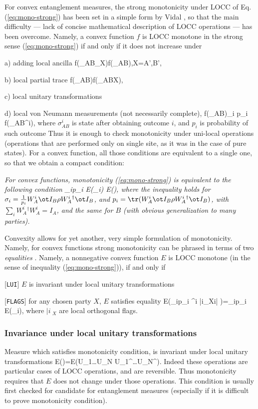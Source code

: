 \documentclass[rmp,12pt,preprint]{revtex4-2}
\begin{document}
For convex entanglement measures, the strong monotonicity under LOCC
of Eq. (\ref{eq:mono-strong}) has been set in a simple form by Vidal
\cite{Vidal-mon2000}, so that the main difficulty --- lack of concise
mathematical description of LOCC operations --- has been overcome.
Namely, a convex function $f$ is LOCC monotone in the strong sense
(\ref{eq:mono-strong}) if and only if it does not increase under
\bei
\item[a)] adding local ancilla
\be
f(\rho_{AB}\ot \sigma_X)\leq f(\rho_{AB}),\quad X=A',B',
\ee
\item[b)] local partial trace
\be
f(\rho_{AB})\leq f(\rho_{ABX}),
\ee
\item[c)] local unitary transformations
\item[d)] local von Neumann measurements (not necessarily complete),
\be
f(\rho_{AB})\geq \sum_i p_i f(\sigma_{AB}^i),
\ee
where $\sigma_{AB}^i$ is state after obtaining outcome $i$,
and $p_i$ is probability of such outcome
\eei
Thus it is enough to check monotonicity under uni-local operations
(operations that are performed only on  single  site, as it was in the case of pure states).
For a convex function, all those conditions are equivalent
to a single one, so that we obtain a compact condition:

{\it For convex functions, monotonicity
(\ref{eq:mono-strong}) is equivalent to the following condition \be
\sum_ip_i E(\sigma_i) \leq E(\rho), \label{eq:mono-unilocal} \ee
where the inequality holds for $\sigma_i=\frac{1}{p_i}W_A^i \ot I_B
\rho W_A^i{}^\dagger\ot I_B$, and $p_i={\tr}(W_A^i \ot I_B \rho
W_A^i{}^\dagger\ot I_B)$, with $\sum_i W_A^i{}^\dagger W_A^i=I_A$,
and the same for $B$ (with obvious generalization to many parties).
}


Convexity allows for yet another, very simple formulation of monotonicity.
Namely, for convex functions strong monotonicity can be phrased in
terms of two {\it equalities} \cite{MH2004-mono}. Namely, a nonnegative
convex function $E$ is LOCC monotone (in the sense of inequality (\ref{eq:mono-strong})),
if and only if
\bei
\item{}[{\tt LUI}] $E$ is invariant under local unitary transformations
\item{}[{\tt FLAGS}] for any chosen party $X$,  $E$ satisfies equality
\be
E\bigl(\sum_ip_i \rho^i \ot |i\>_X\<i| \bigr)=\sum_ip_i E(\rho_i),
\ee
where $|i\>_X$ are local orthogonal flags.
\eei

\subsubsection{Invariance under local unitary transformations}
Measure which satisfies monotonicity condition,
is invariant under local unitary transformations
\be
E(\rho)=E(U_1\ot \ldots U_N \rho U_1^\dagger\ot \ldots U_N^\dagger).
\ee
Indeed these operations are particular cases of LOCC operations,
and are reversible. Thus monotonicity requires that $E$ does not change  under
those operations. This condition is usually first checked for candidate for
entanglement measures (especially if it is difficult to prove
monotonicity condition).
\end{document}
